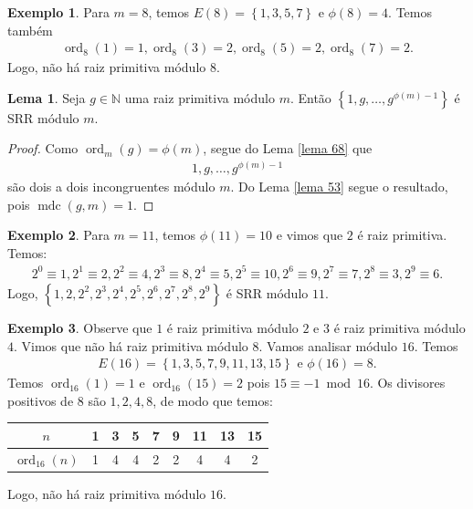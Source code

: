\documentclass[a4paper,11pt,twoside, leqno]{article}
\DeclareMathOperator{\mdc}{mdc}
\DeclareMathOperator{\Ord}{ord}
\theoremstyle{definition}
\newtheorem{lemma}[theorem]{Lema}
\newtheorem*{example}{Exemplo}
\begin{document}
\begin{example}
	Para $m=8$, temos $E(8) = \left\{ 1,3,5,7 \right\}$ e $\phi(8) = 4$. Temos também
	\begin{align*}
	\Ord_8(1) = 1, \Ord_8(3) = 2, \Ord_8(5) = 2, \Ord_8(7) = 2.
	\end{align*}
	Logo, não há raiz primitiva módulo $8$.
\end{example}
\begin{lemma}
	\label{lema 69}
	Seja $g\in\mathbb{N}$ uma raiz primitiva módulo $m$. Então $\left\{ 1,g,\dots, g^{\phi(m) - 1} \right\}$ é SRR módulo $m$.
\end{lemma}
\begin{proof}
	Como $\Ord_m(g) = \phi(m)$, segue do Lema \eqref{lema 68} que 
	\begin{align*}
	1,g,\dots,g^{\phi(m) - 1}
	\end{align*}
	são dois a dois incongruentes módulo $m$. Do Lema \eqref{lema 53} segue o resultado, pois $\mdc(g,m) = 1$.
\end{proof}
\begin{example}
	Para $m=11$, temos $\phi(11) = 10$ e vimos que $2$ é raiz primitiva. Temos:
	\begin{align*}
	2^0\equiv 1, 2^1\equiv 2, 2^2\equiv 4, 2^3\equiv 8, 2^4\equiv 5, 2^5\equiv 10, 2^6\equiv 9, 2^7\equiv 7, 2^8\equiv 3, 2^9\equiv 6.
	\end{align*}
	Logo, $\left\{ 1,2,2^2,2^3,2^4,2^5,2^6,2^7,2^8,2^9 \right\}$ é SRR módulo $11$.
\end{example}
\begin{example}
	Observe que $1$ é raiz primitiva módulo $2$ e $3$ é raiz primitiva módulo $4$. Vimos que não há raiz primitiva módulo $8$. Vamos analisar módulo $16$. Temos
	\begin{align*}
	E(16) = \left\{ 1,3,5,7,9,11,13,15 \right\}\text{ e }\phi(16) = 8.
	\end{align*}
	Temos $\Ord_{16}(1) = 1$ e $\Ord_{16}(15) = 2$ pois $15\equiv -1\bmod 16$. Os divisores positivos de $8$ são $1,2,4,8$, de modo que temos:
	\begin{table}[H]
		\centering 
		\begin{tabular}{c|c|c|c|c|c|c|c|c}
			$n$ & 1 & 3 & 5 & 7 & 9 & 11 & 13 & 15 \\
			\hline
			$\Ord_{16}(n)$ & 1 & 4 & 4 & 2 & 2 & 4 & 4 & 2 
		\end{tabular}
	\end{table}
Logo, não há raiz primitiva módulo $16$.
\end{example}
\end{document}
